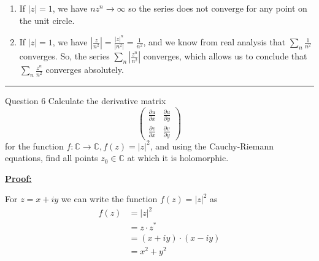 \documentclass{article}
\newcommand{\C}{\mathbb{C}}
\begin{document}
\vskip 0.5cm
\begin{enumerate}[label=(\alph*)]

  \item If $\left| z \right| = 1$, we have $nz^n \rightarrow \infty$ so the series does not converge for any point on the unit circle.
  \item If $\left| z \right| = 1$, we have $\left| \frac{z}{n^2} \right| = \frac{\left| z \right|^n}{\left| n^2 \right|} = \frac{1}{n^2}$, and we know from real analysis that $\sum_{n} \frac{1}{n^2}$ converges. So, the series $\sum_{n} \left|\frac{z^n}{n^2} \right|$ converges, which allows us to conclude that $\sum_n \frac{z^ n}{n^2}$ converges absolutely.
\end{enumerate}

\vskip 0.5cm
\hrule 
\vskip 0.5cm

\begin{mathdefinitionbox}{Question 6}
\vskip 0.5cm
Calculate the derivative matrix 
\[ \begin{pmatrix}
  \frac{\partial u }{\partial x} & \frac{\partial u }{\partial y} \\
  \frac{\partial v }{\partial x} & \frac{\partial v }{\partial y}
\end{pmatrix} \]
for the function $f : \C \rightarrow \C, f(z) = |z|^2$, and using the Cauchy-Riemann equations, find all points $z_0 \in \C$ at which it is holomorphic.
\end{mathdefinitionbox}

\vskip 0.5cm
\underline{\textbf{Proof:}}

\vskip 0.5cm
For $z = x+ iy$ we can write the function $f(z) = |z|^2$ as 
\begin{align*}
  f(z) &= |z|^2 \\
  &= z \cdot z^{*} \\
  &= (x + iy) \cdot (x - iy) \\
  &= x^2 + y^2
\end{align*}
\end{document}
